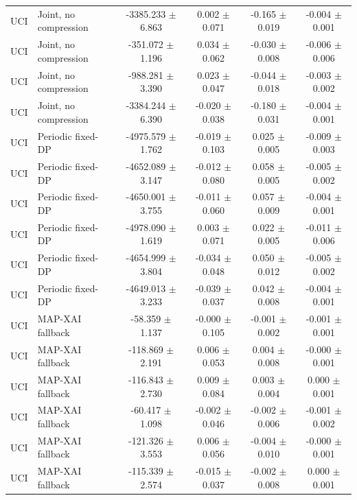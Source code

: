 \begin{table}[t]
\begin{tabular}{llcccc}
UCI & Joint, no compression & -3385.233 $\pm$ 6.863 & 0.002 $\pm$ 0.071 & -0.165 $\pm$ 0.019 & -0.004 $\pm$ 0.001 \\
UCI & Joint, no compression & -351.072 $\pm$ 1.196 & 0.034 $\pm$ 0.062 & -0.030 $\pm$ 0.008 & -0.006 $\pm$ 0.006 \\
UCI & Joint, no compression & -988.281 $\pm$ 3.390 & 0.023 $\pm$ 0.047 & -0.044 $\pm$ 0.018 & -0.003 $\pm$ 0.002 \\
UCI & Joint, no compression & -3384.244 $\pm$ 6.390 & -0.020 $\pm$ 0.038 & -0.180 $\pm$ 0.031 & -0.004 $\pm$ 0.001 \\
UCI & Periodic fixed-DP & -4975.579 $\pm$ 1.762 & -0.019 $\pm$ 0.103 & 0.025 $\pm$ 0.005 & -0.009 $\pm$ 0.003 \\
UCI & Periodic fixed-DP & -4652.089 $\pm$ 3.147 & -0.012 $\pm$ 0.080 & 0.058 $\pm$ 0.005 & -0.005 $\pm$ 0.002 \\
UCI & Periodic fixed-DP & -4650.001 $\pm$ 3.755 & -0.011 $\pm$ 0.060 & 0.057 $\pm$ 0.009 & -0.004 $\pm$ 0.001 \\
UCI & Periodic fixed-DP & -4978.090 $\pm$ 1.619 & 0.003 $\pm$ 0.071 & 0.022 $\pm$ 0.005 & -0.011 $\pm$ 0.006 \\
UCI & Periodic fixed-DP & -4654.999 $\pm$ 3.804 & -0.034 $\pm$ 0.048 & 0.050 $\pm$ 0.012 & -0.005 $\pm$ 0.002 \\
UCI & Periodic fixed-DP & -4649.013 $\pm$ 3.233 & -0.039 $\pm$ 0.037 & 0.042 $\pm$ 0.008 & -0.004 $\pm$ 0.001 \\
UCI & MAP-XAI fallback & -58.359 $\pm$ 1.137 & -0.000 $\pm$ 0.105 & -0.001 $\pm$ 0.002 & -0.001 $\pm$ 0.001 \\
UCI & MAP-XAI fallback & -118.869 $\pm$ 2.191 & 0.006 $\pm$ 0.053 & 0.004 $\pm$ 0.008 & -0.000 $\pm$ 0.001 \\
UCI & MAP-XAI fallback & -116.843 $\pm$ 2.730 & 0.009 $\pm$ 0.084 & 0.003 $\pm$ 0.004 & 0.000 $\pm$ 0.001 \\
UCI & MAP-XAI fallback & -60.417 $\pm$ 1.098 & -0.002 $\pm$ 0.046 & -0.002 $\pm$ 0.006 & -0.001 $\pm$ 0.002 \\
UCI & MAP-XAI fallback & -121.326 $\pm$ 3.553 & 0.006 $\pm$ 0.056 & -0.004 $\pm$ 0.010 & -0.000 $\pm$ 0.001 \\
UCI & MAP-XAI fallback & -115.339 $\pm$ 2.574 & -0.015 $\pm$ 0.037 & -0.002 $\pm$ 0.008 & 0.000 $\pm$ 0.001 \\
\bottomrule
\end{tabular}
\end{table}
